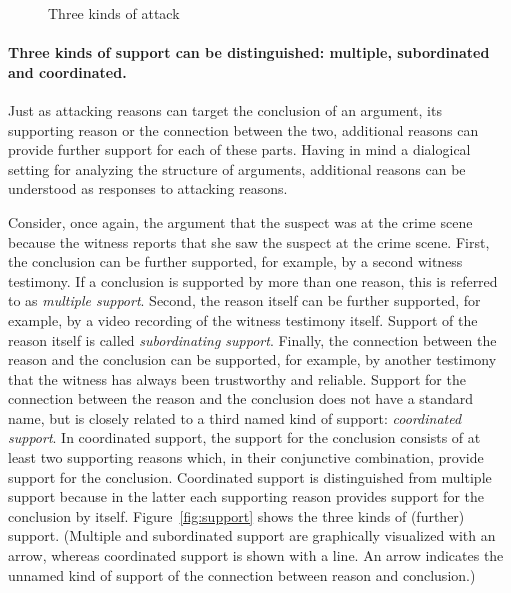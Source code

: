 \documentclass[10pt]{article}
\begin{document}
\begin{figure}[bt]
\centering

\caption{Three kinds of attack\label{fig:arg3}}
\end{figure}

\paragraph{Three kinds of support can be distinguished: multiple, subordinated and coordinated.}


Just as attacking reasons can target the conclusion of an argument, its supporting
reason or the connection between the two, additional reasons 
can provide further support for each of these parts. Having in mind a dialogical setting for analyzing the structure 
of arguments, additional reasons can be understood 
as responses to attacking reasons. 

Consider, once again, the argument that the suspect was at the crime scene because the witness reports that she saw the suspect at the crime scene. 
First, the conclusion can be further supported, for example, by a second witness testimony. 
If a conclusion is supported by more than one reason, this is referred 
to as \textit{multiple support}. 
%
Second, the reason itself can be further supported, for example, 
by a video recording of the witness testimony itself. 
Support of the reason itself is called \textit{subordinating support}. 
%
Finally, the connection between the reason and the conclusion can be supported, for example, 
by another testimony that the witness has always been trustworthy and reliable. 
Support for the connection between the reason and the conclusion does not have a standard name, but is closely related 
to a third named kind of support: \textit{coordinated support}. In coordinated support, the support for the conclusion consists of at least 
two supporting reasons which, in their conjunctive combination, provide support for the conclusion. Coordinated support is distinguished from multiple support because in the latter each supporting reason 
provides support for the conclusion by itself. 
%
Figure~\ref{fig:support} shows the three kinds of (further) support. (Multiple and subordinated support are graphically visualized with an arrow, whereas coordinated support is shown with a line. An arrow indicates the unnamed kind of support of the connection between reason and conclusion.)
\end{document}
